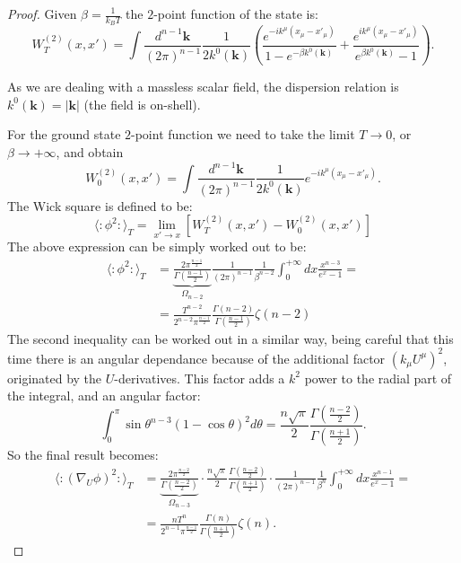 \begin{proof}
    Given \(\beta = \frac{1}{k_BT}\) the \(2\)-point function of the state is:
	\[
	W^{(2)}_T(x, x') = \int \frac{d^{n - 1}\mathbf{k}}{(2\pi)^{n - 1}}\frac{1}{2k^0(\mathbf{k})} \left(\frac{e^{-ik^{\mu}(x_{\mu} - x'_{\mu})}}{1 - e^{-\beta k^0(\mathbf{k})}} + \frac{e^{ik^{\mu}(x_{\mu} - x'_{\mu})}}{e^{\beta k^0(\mathbf{k})} - 1}\right). 
	\]

	As we are dealing with a massless scalar field, the dispersion relation is \(k^0(\mathbf{k}) = \vert \mathbf{k}\vert\) (the field is on-shell).

	For the ground state \(2\)-point function we need to take the limit \(T\rightarrow 0\), or \(\beta\rightarrow +\infty\), and obtain
	\[
	W^{(2)}_0(x, x') = \int \frac{d^{n - 1}\mathbf{k}}{(2\pi)^{n - 1}}\frac{1}{2k^0(\mathbf{k})} e^{-ik^{\mu}(x_{\mu} - x'_{\mu})}. 
	\]
	The Wick square is defined to be:
	\[
		\langle \colon \phi^2 \colon\rangle_T = \lim_{x'\rightarrow x} \left[W^{(2)}_T(x, x') - W^{(2)}_0(x, x')\right]
	\]
	The above expression can be simply worked out to be:
	\begin{align*}
		\langle \colon \phi^2 \colon\rangle_T &= \underbrace{\frac{2\pi^{\frac{n-1}{2}}}{\Gamma(\frac{n - 1}{2})}}_{\Omega_{n - 2}}\frac{1}{(2\pi)^{n - 1}}\frac{1}{\beta^{n - 2}}\int_0^{+\infty}dx \frac{x^{n - 3}}{e^x - 1} =\\
		&= \frac{T^{n - 2}}{2^{n - 2}\pi^{\frac{n - 1}{2}}}\frac{\Gamma(n - 2)}{\Gamma\left(\frac{n - 1}{2}\right)}\zeta(n - 2)
	\end{align*}
	The second inequality can be worked out in a similar way, being careful that this time there is an angular dependance because of the additional factor \((k_{\mu}U^{\mu})^2\), originated by the \(U\)-derivatives. This factor adds a \(k^2\) power to the radial part of the integral, and an angular factor:
	\[
	\int_0^{\pi} \sin\theta^{n - 3} (1 - \cos\theta)^2 d\theta = \frac{n\sqrt{\pi}}{2}\frac{\Gamma\left(\frac{n - 2}{2}\right)}{\Gamma\left(\frac{n + 1}{2}\right)}.
	\]
	So the final result becomes:
	\begin{align*}
		\langle \colon (\nabla_U\phi)^2 \colon\rangle_T &= 
		\underbrace{\frac{2\pi^{\frac{n-2}{2}}}{\Gamma(\frac{n - 2}{2})}}_{\Omega_{n - 3}} \cdot \frac{n\sqrt{\pi}}{2}\frac{\Gamma\left(\frac{n - 2}{2}\right)}{\Gamma\left(\frac{n + 1}{2}\right)} \cdot \frac{1}{(2\pi)^{n - 1}}\frac{1}{\beta^{n}}\int_0^{+\infty}dx \frac{x^{n - 1}}{e^x - 1} = \\
		&= \frac{nT^n}{2^{n - 1}\pi^{\frac{n - 1}{2}}} \frac{\Gamma(n)}{\Gamma\left(\frac{n + 1}{2}\right)} \zeta(n).
	\end{align*}
\end{proof}

